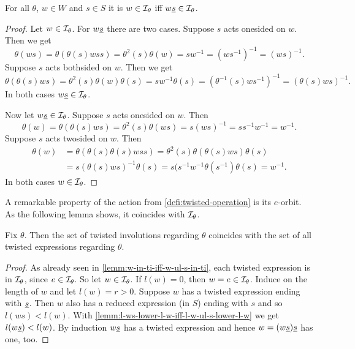\begin{lemm}
	For all $\theta$, $w \in W$ and $s \in S$ it is $w \in \mathcal{I}_{\theta}$ iff $w \underline{s} \in \mathcal{I}_{\theta}$.

	\begin{proof}
		Let $w \in \mathcal{I}_{\theta}$. For $w \underline{s}$ there are two cases. Suppose $s$ acts onesided on $w$. Then we get
		$$ \theta(ws) = \theta(\theta(s)wss) = \theta^2(s) \theta(w) = sw^{-1} = (ws^{-1})^{-1} = (ws)^{-1}. $$
		Suppose $s$ acts bothsided on $w$. Then we get
		$$ \theta(\theta(s)ws) = \theta^2(s) \theta(w) \theta(s) = sw^{-1}\theta(s) = (\theta^{-1}(s)ws^{-1})^{-1} = (\theta(s)ws)^{-1}. $$
		In both cases $w \underline{s} \in \mathcal{I}_{\theta}$.

		Now let $w \underline{s} \in \mathcal{I}_{\theta}$. Suppose $s$ acts onesided on $w$. Then
		$$ \theta(w) = \theta(\theta(s)ws) = \theta^2(s)\theta(ws) = s (ws)^{-1} = ss^{-1}w^{-1} = w^{-1}. $$
		Suppose $s$ acts twosided on $w$. Then
		\begin{align*}
			\theta(w)	& = \theta(\theta(s)\theta(s)wss) = \theta^2(s) \theta(\theta(s)ws) \theta(s) \\
						& = s (\theta(s)ws)^{-1} \theta(s) = s(s^{-1} w^{-1} \theta(s^{-1}) \theta(s) = w^{-1}.
		\end{align*}
		In both cases $w \in \mathcal{I}_{\theta}$.
	\end{proof}
\end{lemm}

A remarkable property of the action from \ref{defi:twisted-operation} is its $e$-orbit. As the following lemma shows, it coincides with $\mathcal{I}_{\theta}$.

\begin{lemm}
	Fix $\theta$. Then the set of twisted involutions regarding $\theta$ coincides with the set of all twisted expressions regarding $\theta$.

	\begin{proof}
		As already seen in \ref{lemm:w-in-ti-iff-w-ul-s-in-ti}, each twisted expression is in $\mathcal{I}_{\theta}$, since $e \in \mathcal{I}_{\theta}$. So let $w \in \mathcal{I}_{\theta}$. If $l(w) = 0$, then $w = e \in \mathcal{I}_{\theta}$. Induce on the length of $w$ and let $l(w) = r > 0$. Suppose $w$ has a twisted expression ending with $\underline{s}$. Then $w$ also has a reduced expression (in $S$) ending with $s$ and so $l(ws) < l(w)$. With \ref{lemm:l-ws-lower-l-w-iff-l-w-ul-s-lower-l-w} we get $l(w \underline{s}) < l(w)$. By induction $w \underline{s}$ has a twisted expression and hence $w = (w \underline{s}) \underline{s}$ has one, too.
	\end{proof} 
\end{lemm}

